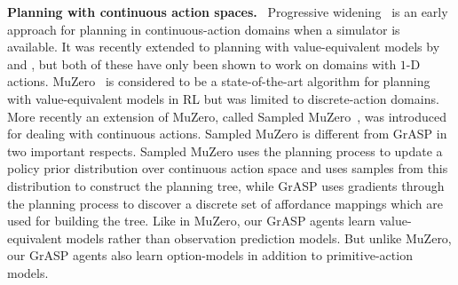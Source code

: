 \documentclass[nohyperref]{article}
\theoremstyle{plain}
\theoremstyle{definition}
\theoremstyle{remark}
\renewcommand{\paragraph}[1]{\textbf{#1}\ }
\begin{document}
\paragraph{Planning with continuous action spaces.}
Progressive widening~\citep{couetoux2011continuous} is an early approach for planning in continuous-action domains when a simulator is available. It was recently extended to planning with value-equivalent models by \citet{moerland2018a0c} and \citet{yang2020continuous}, but both of these have only been shown to work on domains with $1$-D actions. 
MuZero~\citep{schrittwieser2020mastering} 
is considered to be a state-of-the-art algorithm for planning with value-equivalent models in RL but was limited to discrete-action domains.
More recently an extension of MuZero, called Sampled MuZero~\citep{hubert2021learning}, was introduced for dealing with continuous actions.
Sampled MuZero is different from {G}r{ASP} in two important respects. Sampled MuZero uses the planning process to update a policy prior distribution over continuous action space and uses samples from this distribution to construct the planning tree, while {G}r{ASP} uses gradients through the planning process to discover a discrete set of affordance mappings which are used for building the tree. Like in MuZero, our {G}r{ASP} agents learn value-equivalent models rather than %
observation prediction models. But unlike MuZero, our {G}r{ASP} agents also learn option-models in addition to primitive-action models. 
\end{document}
